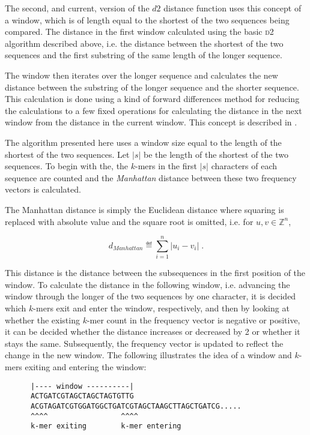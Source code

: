 The second, and current, version of the $d2$ distance function uses this
concept of a window, which is of length equal to the shortest of the two
sequences being compared. The distance in the first window calculated using the
basic \textsc{d2} algorithm described above, i.e. the distance between the
shortest of the two sequences and the first substring of the same length of the
longer sequence.

The window then iterates over the longer sequence and calculates the new
distance between the substring of the longer sequence and the shorter sequence.
This calculation is done using a kind of forward differences method for
reducing the calculations to a few fixed operations for calculating the
distance in the next window from the distance in the current window. This
concept is described in \cite{hazelhurst}.

The algorithm presented here uses a window size equal to the length of the
shortest of the two sequences. Let $|s|$ be the length of the shortest of the
two sequences. To begin with the, the $k$-mers in the first $|s|$ characters of
each sequence are counted and the \emph{Manhattan} distance between these two
frequency vectors is calculated.

The Manhattan distance is simply the Euclidean distance where squaring is
replaced with absolute value and the square root is omitted, i.e. for
$u, v \in \mathbb{Z}^n$,

\begin{equation}
  d_{Manhattan} \eqdef \sum_{i=1}^{n} |u_i - v_i| \;.
\end{equation}

This distance is the distance between the subsequences in the first position of
the window. To calculate the distance in the following window, i.e. advancing
the window through the longer of the two sequences by one character, it is
decided which $k$-mers exit and enter the window, respectively, and then by
looking at whether the existing $k$-mer count in the frequency vector is
negative or positive, it can be decided whether the distance increases or
decreased by 2 or whether it stays the same. Subsequently, the frequency vector
is updated to reflect the change in the new window. The following illustrates
the idea of a window and $k$-mers exiting and entering the window:

\begin{verbatim}
      |---- window ----------|
      ACTGATCGTAGCTAGCTAGTGTTG
      ACGTAGATCGTGGATGGCTGATCGTAGCTAAGCTTAGCTGATCG.....
      ^^^^                 ^^^^
      k-mer exiting        k-mer entering
\end{verbatim}

